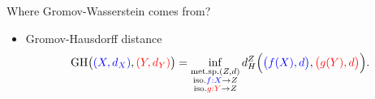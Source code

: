 \documentclass{beamer}
\newcommand{\gh}{\text{GH}}
\begin{document}
\begin{frame}{Where Gromov-Wasserstein comes from?}
\begin{minipage}[t]{0.6\linewidth}
\begin{itemize}
    \vspace{1cm}
    \item Gromov-Hausdorff distance \parencite{Gromov81,Gromov99}
    \vspace{-0.3cm}
    \begin{align*}
      \gh \big( {\color{blue}{(X, d_X)}}, {\color{red}{(Y, d_Y)}} \big) =
      \inf_{\substack{\text{met.sp.}(Z, d) \\
      \text{iso.} {\color{blue}{f: X}} \to Z \\
      \text{iso.} {\color{red}{g: Y}} \to Z}}
      d_{H}^{Z} \Big( {\color{blue}{\big(f(X), d \big)}}, {\color{red}{\big(g(Y), d \big)}} \Big).
      \end{align*}
  \end{itemize}
  \end{minipage}%

  \hfill%
  \hspace{-6cm}
  \begin{minipage}[t]{0.5\linewidth}
\end{minipage}
\vspace{1cm}

\end{frame}
\end{document}
